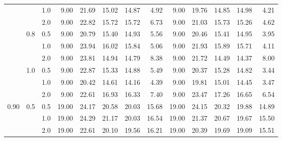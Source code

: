 \documentclass{article}
\begin{document}
{\begin{tabular}{lllrrrrrrrrrr}
          &     & 1.0 &    9.00 &       21.69 &                 15.02 &                    14.87 &           4.92 &    9.00 &       19.76 &                 14.85 &                    14.98 &           4.21 \\
          &     & 2.0 &    9.00 &       22.82 &                 15.72 &                    15.72 &           6.73 &    9.00 &       21.03 &                 15.73 &                    15.26 &           4.62 \\
          & 0.8 & 0.5 &    9.00 &       20.79 &                 15.40 &                    14.93 &           5.56 &    9.00 &       20.46 &                 15.41 &                    14.95 &           3.95 \\
          &     & 1.0 &    9.00 &       23.94 &                 16.02 &                    15.84 &           5.06 &    9.00 &       21.93 &                 15.89 &                    15.71 &           4.11 \\
          &     & 2.0 &    9.00 &       23.81 &                 14.94 &                    14.79 &           8.38 &    9.00 &       21.72 &                 14.49 &                    14.37 &           8.00 \\
          & 1.0 & 0.5 &    9.00 &       22.87 &                 15.33 &                    14.88 &           5.49 &    9.00 &       20.37 &                 15.28 &                    14.82 &           3.44 \\
          &     & 1.0 &    9.00 &       20.42 &                 14.61 &                    14.16 &           4.39 &    9.00 &       19.81 &                 15.01 &                    14.45 &           3.47 \\
          &     & 2.0 &    9.00 &       22.61 &                 16.93 &                    16.33 &           7.40 &    9.00 &       23.47 &                 17.26 &                    16.65 &           6.54 \\
     0.90 & 0.5 & 0.5 &   19.00 &       24.17 &                 20.58 &                    20.03 &          15.68 &   19.00 &       24.15 &                 20.32 &                    19.88 &          14.89 \\
          &     & 1.0 &   19.00 &       24.29 &                 21.17 &                    20.03 &          16.54 &   19.00 &       21.37 &                 20.67 &                    19.67 &          15.50 \\
          &     & 2.0 &   19.00 &       22.61 &                 20.10 &                    19.56 &          16.21 &   19.00 &       20.39 &                 19.69 &                    19.09 &          15.51 \\

\end{tabular}}
\end{document}
